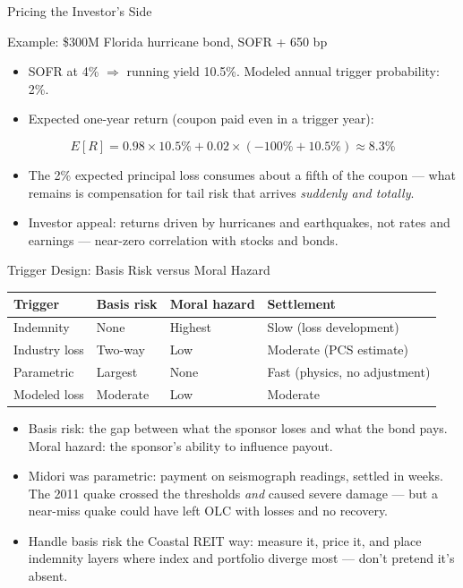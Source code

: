 \documentclass[11pt, aspectratio=169]{beamer}
\begin{document}
\begin{frame}{Pricing the Investor's Side}
\begin{exampleblock}{Example: \$300M Florida hurricane bond, SOFR + 650 bp}
\begin{itemize}
  \item SOFR at 4\% $\Rightarrow$ running yield 10.5\%. Modeled annual trigger probability: 2\%.
  \item Expected one-year return (coupon paid even in a trigger year):
\end{itemize}
\[
E[R] = 0.98 \times 10.5\% + 0.02 \times (-100\% + 10.5\%) \approx 8.3\%
\]
\begin{itemize}
  \item The 2\% expected principal loss consumes about a fifth of the coupon --- what remains is compensation for tail risk that arrives \emph{suddenly and totally}.
\end{itemize}
\end{exampleblock}
\begin{itemize}
  \item Investor appeal: returns driven by hurricanes and earthquakes, not rates and earnings --- near-zero correlation with stocks and bonds.
\end{itemize}
\end{frame}

\begin{frame}{Trigger Design: Basis Risk versus Moral Hazard}
\begin{center}\small
\begin{tabular}{@{}llll@{}}
\toprule
\textbf{Trigger} & \textbf{Basis risk} & \textbf{Moral hazard} & \textbf{Settlement} \\
\midrule
Indemnity & None & Highest & Slow (loss development) \\
Industry loss & Two-way & Low & Moderate (PCS estimate) \\
Parametric & Largest & None & \alert{Fast} (physics, no adjustment) \\
Modeled loss & Moderate & Low & Moderate \\
\bottomrule
\end{tabular}
\end{center}
\medskip
\begin{itemize}
  \item \alert{Basis risk}: the gap between what the sponsor loses and what the bond pays. \alert{Moral hazard}: the sponsor's ability to influence payout.
  \item Midori was parametric: payment on seismograph readings, settled in weeks. The 2011 quake crossed the thresholds \emph{and} caused severe damage --- but a near-miss quake could have left OLC with losses and no recovery.
  \item Handle basis risk the Coastal REIT way: measure it, price it, and place indemnity layers where index and portfolio diverge most --- don't pretend it's absent.
\end{itemize}
\end{frame}
\end{document}
